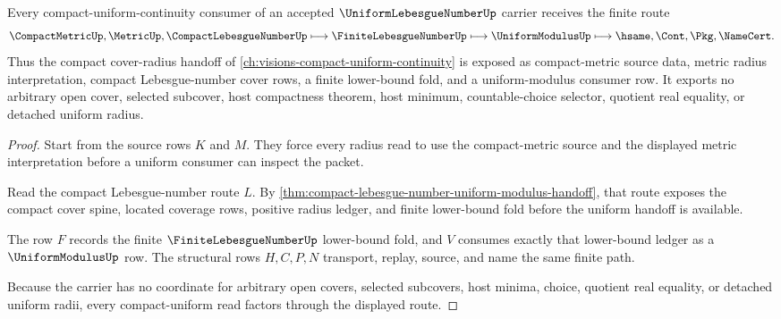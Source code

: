 \begin{theorem}
\label{thm:uniform-lebesgue-number-compact-uniform-handoff}
Every compact-uniform-continuity consumer of an accepted $\UniformLebesgueNumberUp$ carrier receives the finite route
$$
\CompactMetricUp,\MetricUp,\CompactLebesgueNumberUp
\longmapsto
\FiniteLebesgueNumberUp
\longmapsto
\UniformModulusUp
\longmapsto
\hsame,\Cont,\Pkg,\NameCert .
$$
Thus the compact cover-radius handoff of \autoref{ch:visions-compact-uniform-continuity} is exposed as compact-metric source data, metric radius interpretation, compact Lebesgue-number cover rows, a finite lower-bound fold, and a uniform-modulus consumer row. It exports no arbitrary open cover, selected subcover, host compactness theorem, host minimum, countable-choice selector, quotient real equality, or detached uniform radius.
\end{theorem}
\begin{proof}
Start from the source rows $K$ and $M$. They force every radius read to use the compact-metric source and the displayed metric interpretation before a uniform consumer can inspect the packet.

Read the compact Lebesgue-number route $L$. By \autoref{thm:compact-lebesgue-number-uniform-modulus-handoff}, that route exposes the compact cover spine, located coverage rows, positive radius ledger, and finite lower-bound fold before the uniform handoff is available.

The row $F$ records the finite $\FiniteLebesgueNumberUp$ lower-bound fold, and $V$ consumes exactly that lower-bound ledger as a $\UniformModulusUp$ row. The structural rows $H,C,P,N$ transport, replay, source, and name the same finite path.

Because the carrier has no coordinate for arbitrary open covers, selected subcovers, host minima, choice, quotient real equality, or detached uniform radii, every compact-uniform read factors through the displayed route.
\end{proof}



